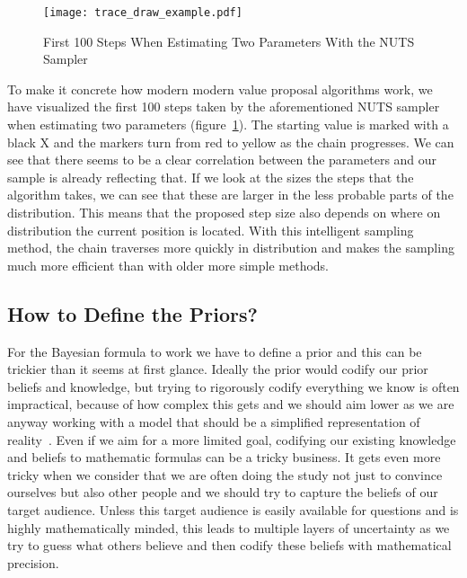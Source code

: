 \documentclass[12pt,a4paper,leqno]{report}
\theoremstyle{plain}
\theoremstyle{definition}
\theoremstyle{remark}
\begin{document}
\begin{figure}[H]
    \centering
    \caption{First 100 Steps When Estimating Two Parameters With the NUTS Sampler}\label{traceexample}
    \texttt{[image: trace\_draw\_example.pdf]}
\end{figure}

To make it concrete how modern modern value proposal algorithms work, we
have visualized the first 100 steps taken by the aforementioned NUTS sampler
when estimating two parameters (figure\ \ref{traceexample}). The starting value is
marked with a black X and the markers turn from red to yellow as the chain progresses.
We can see that there seems to be a clear correlation between the parameters and our
sample is already reflecting that. If we look at the sizes the steps that the algorithm
takes, we can see that these are larger in the less probable parts of the distribution.
This means that the proposed step size also depends on where on distribution the current position
is located. With this intelligent sampling method, the chain traverses more
quickly in distribution and makes the sampling much more efficient than with older more
simple methods.

\subsection{How to Define the Priors?}\label{bayesproblems}

For the Bayesian formula to work we have to define a prior and this can be
trickier than it seems at first glance. Ideally the prior would codify our prior
beliefs and knowledge, but trying to rigorously codify everything we
know is often impractical, because of how complex this gets and we should aim lower as we are
anyway working with a model that should be a simplified representation of reality\ \cite{gelman}. Even if
we aim for a more limited goal, codifying our existing knowledge and beliefs
to mathematic formulas can be a tricky business. It gets even more
tricky when we consider that we are often doing the study not just to convince ourselves
but also other people and we should try to capture the beliefs of our target audience.
Unless this target audience is easily available for questions and is highly mathematically minded,
this leads to multiple layers of uncertainty as we try to guess what others
believe and then codify these beliefs with mathematical precision.
\end{document}
